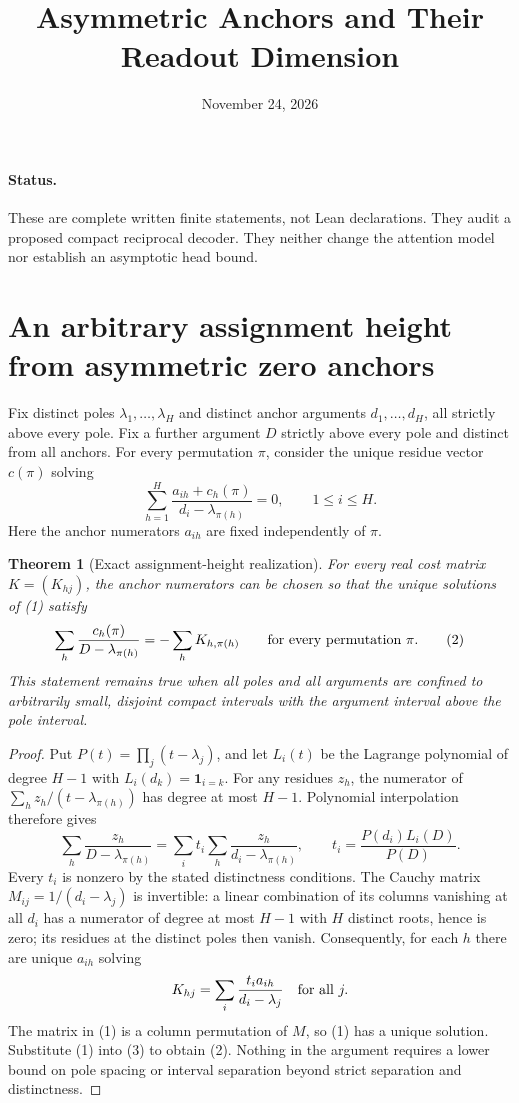 \documentclass[11pt]{article}
\title{Asymmetric Anchors and Their Readout Dimension}
\author{}
\date{November 24, 2026}
\newtheorem{theorem}{Theorem}
\begin{document}
\maketitle

\paragraph{Status.}
These are complete written finite statements, not Lean declarations.
They audit a proposed compact reciprocal decoder. They neither change
the attention model nor establish an asymptotic head bound.

\section{An arbitrary assignment height from asymmetric zero anchors}

Fix distinct poles $\lambda_1,\ldots,\lambda_H$ and distinct anchor
arguments $d_1,\ldots,d_H$, all strictly above every pole. Fix a further
argument $D$ strictly above every pole and distinct from all anchors.
For every permutation $\pi$, consider the unique residue vector $c(\pi)$
solving
\[
 \sum_{h=1}^H\frac{a_{ih}+c_h(\pi)}{d_i-\lambda_{\pi(h)}}=0,
 \qquad 1\leq i\leq H. \tag{1}
\]
Here the anchor numerators $a_{ih}$ are fixed independently of $\pi$.

\begin{theorem}[Exact assignment-height realization]
For every real cost matrix $K=(K_{hj})$, the anchor numerators can be
chosen so that the unique solutions of (1) satisfy
\[
 \sum_h\frac{c_h(\pi)}{D-\lambda_{\pi(h)}}
 =-\sum_h K_{h,\pi(h)}
 \qquad\hbox{for every permutation }\pi. \tag{2}
\]
This statement remains true when all poles and all arguments are confined
to arbitrarily small, disjoint compact intervals with the argument
interval above the pole interval.
\end{theorem}

\begin{proof}
Put $P(t)=\prod_j(t-\lambda_j)$, and let $L_i(t)$ be the Lagrange
polynomial of degree $H-1$ with $L_i(d_k)=\mathbf1_{i=k}$.
For any residues $z_h$, the numerator of
$\sum_hz_h/(t-\lambda_{\pi(h)})$ has degree at most $H-1$.
Polynomial interpolation therefore gives
\[
 \sum_h\frac{z_h}{D-\lambda_{\pi(h)}}
 =\sum_i t_i\sum_h\frac{z_h}{d_i-\lambda_{\pi(h)}},
 \qquad t_i=\frac{P(d_i)L_i(D)}{P(D)}. \tag{3}
\]
Every $t_i$ is nonzero by the stated distinctness conditions.
The Cauchy matrix $M_{ij}=1/(d_i-\lambda_j)$ is invertible:
a linear combination of its columns vanishing at all $d_i$ has a
numerator of degree at most $H-1$ with $H$ distinct roots, hence is
zero; its residues at the distinct poles then vanish.
Consequently, for each $h$ there are unique $a_{ih}$ solving
\[
 K_{hj}=\sum_i\frac{t_i a_{ih}}{d_i-\lambda_j}
 \quad\hbox{for all }j.
\]
The matrix in (1) is a column permutation of $M$, so (1) has a unique
solution. Substitute (1) into (3) to obtain (2). Nothing in the argument
requires a lower bound on pole spacing or interval separation beyond
strict separation and distinctness.
\end{proof}
\end{document}
